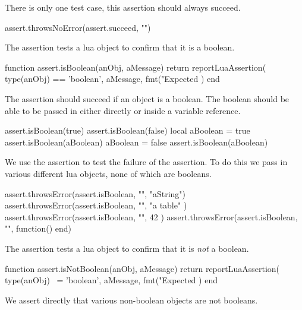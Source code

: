 There is only one test case, this assertion should always succeed. 

\startLuaTest
  assert.throwsNoError(assert.succeed, "")
\stopLuaTest
\stopTestCase

\stopTestSuite


The  assertion tests a lua object to confirm that 
it is a boolean. 

\startLuaCode
function assert.isBoolean(anObj, aMessage)
  return reportLuaAssertion(
    type(anObj) == 'boolean',
    aMessage,
    fmt("Expected %
  )
end
\stopLuaCode


The  assertion should succeed if an object is a 
boolean. The boolean should be able to be passed in either directly or 
inside a variable reference. 

\startLuaTest
  assert.isBoolean(true)
  assert.isBoolean(false)
  local aBoolean = true
  assert.isBoolean(aBoolean)
  aBoolean = false
  assert.isBoolean(aBoolean)
\stopLuaTest
\stopTestCase


We use the  assertion to test the failure of the 
 assertion. To do this we pass in various different 
lua objects, none of which are booleans. 

\startLuaTest
  assert.throwsError(assert.isBoolean, "", "aString")
  assert.throwsError(assert.isBoolean, "", { "a table" })
  assert.throwsError(assert.isBoolean, "", 42 )
  assert.throwsError(assert.isBoolean, "", function() end)
\stopLuaTest
\stopTestCase

\stopTestSuite


The  assertion tests a lua object to confirm 
that it is \emph{not} a boolean. 

\startLuaCode
function assert.isNotBoolean(anObj, aMessage)
  return reportLuaAssertion(
    type(anObj) ~= 'boolean',
    aMessage,
    fmt("Expected %
  )
end
\stopLuaCode


We assert directly that various non-boolean objects are not booleans. 

